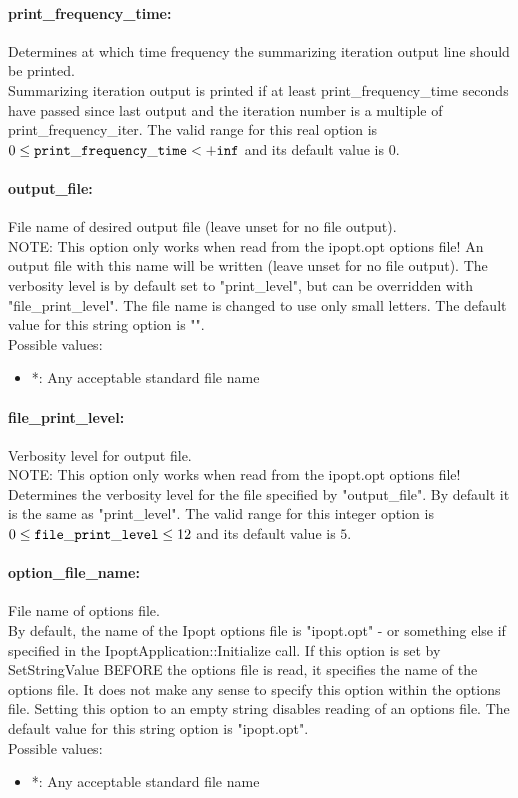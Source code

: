 \paragraph{print\_frequency\_time:}\label{opt:print_frequency_time} Determines at which time frequency the summarizing iteration output line should be printed. \\
 Summarizing iteration output is printed if at least print\_frequency\_time seconds have passed since last output and the iteration number is a multiple of print\_frequency\_iter. The valid range for this real option is 
$0 \le {\tt print\_frequency\_time } <  {\tt +inf}$
and its default value is $0$.


\paragraph{output\_file:}\label{opt:output_file} File name of desired output file (leave unset for no file output). \\
 NOTE: This option only works when read from the ipopt.opt options file! An output file with this name will be written (leave unset for no file output).  The verbosity level is by default set to "print\_level", but can be overridden with "file\_print\_level".  The file name is changed to use only small letters. The default value for this string option is "".
\\ 
Possible values:
\begin{itemize}
   \item *: Any acceptable standard file name
\end{itemize}

\paragraph{file\_print\_level:}\label{opt:file_print_level} Verbosity level for output file. \\
 NOTE: This option only works when read from the ipopt.opt options file! Determines the verbosity level for the file specified by "output\_file".  By default it is the same as "print\_level". The valid range for this integer option is
$0 \le {\tt file\_print\_level } \le 12$
and its default value is $5$.


\paragraph{option\_file\_name:}\label{opt:option_file_name} File name of options file. \\
 By default, the name of the Ipopt options file is "ipopt.opt" - or something else if specified in the IpoptApplication::Initialize call. If this option is set by SetStringValue BEFORE the options file is read, it specifies the name of the options file.  It does not make any sense to specify this option within the options file. Setting this option to an empty string disables reading of an options file. The default value for this string option is "ipopt.opt".
\\ 
Possible values:
\begin{itemize}
   \item *: Any acceptable standard file name
\end{itemize}

